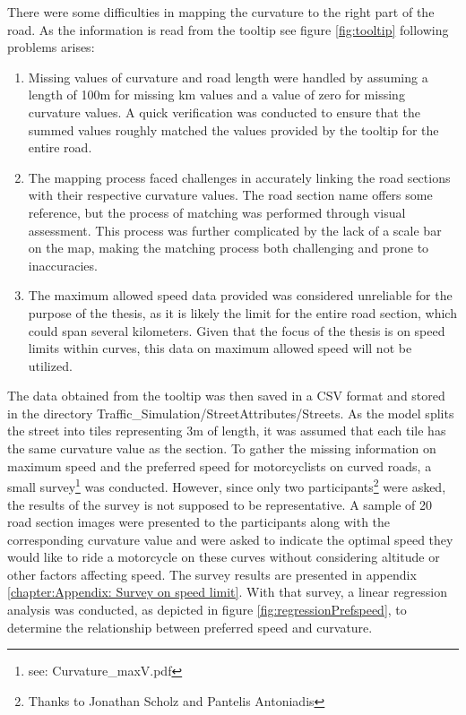 There were some difficulties in mapping the curvature to the right part of the road. As the information is read from the tooltip see figure \ref{fig:tooltip} following problems arises:
\begin{enumerate}
    \item Missing values of curvature and road length were handled by assuming a length of 100m for missing km values and a value of zero for missing curvature values. A quick verification was conducted to ensure that the summed values roughly matched the values provided by the tooltip for the entire road. 
    \item The mapping process faced challenges in accurately linking the road sections with their respective curvature values. The road section name offers some reference, but the process of matching was performed through visual assessment. This process was further complicated by the lack of a scale bar on the map, making the matching process both challenging and prone to inaccuracies.
    \item The maximum allowed speed data provided was considered unreliable for the purpose of the thesis, as it is likely the limit for the entire road section, which could span several kilometers. Given that the focus of the thesis is on speed limits within curves, this data on maximum allowed speed will not be utilized.
\end{enumerate}

The data obtained from the tooltip was then saved in a CSV format and stored in the directory Traffic\_Simulation/StreetAttributes/Streets. As the model splits the street into tiles representing 3m of length, it was assumed that each tile has the same curvature value as the section. 
To gather the missing information on maximum speed and the preferred speed for motorcyclists on curved roads, a small survey\footnote{see: Curvature\_maxV.pdf} was conducted. However, since only two  participants\footnote{Thanks to Jonathan Scholz and Pantelis Antoniadis} were asked, the results of the survey is not supposed to be representative. A sample of 20 road section images were presented to the participants along with the corresponding curvature value and were asked to indicate the optimal speed they would like to ride a motorcycle on these curves without considering altitude or other factors affecting speed. The survey results are presented in appendix \ref{chapter:Appendix: Survey on speed limit}. With that survey, a linear regression analysis was conducted, as depicted in figure \ref{fig:regressionPrefspeed}, to determine the relationship between preferred speed and curvature. 

